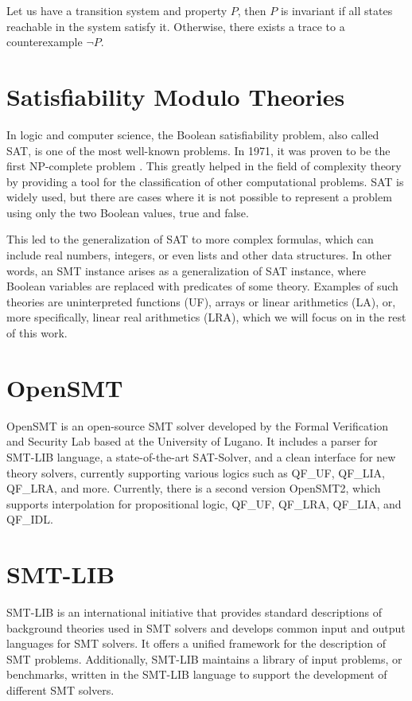 \vspace{\baselineskip}Let us have a transition system and property $P$, then $P$ is invariant if all states reachable in the system satisfy it. Otherwise, there exists a trace to a counterexample $\neg P$.


\section{Satisfiability Modulo Theories}
\noindent In logic and computer science, the Boolean satisfiability problem, also called SAT, is one of the most well-known problems. In 1971, it was proven to be the first NP-complete problem  \cite{10.1145/800157.805047}. This greatly helped in the field of complexity theory by providing a tool for the classification of other computational problems. SAT is widely used, but there are cases where it is not possible to represent a problem using only the two Boolean values, true and false.

This led to the generalization of SAT to more complex formulas, which can include real numbers, integers, or even lists and other data structures. In other words, an SMT instance arises as a generalization of SAT instance, where Boolean variables are replaced with predicates of some theory. Examples of such theories are uninterpreted functions (UF), arrays or linear arithmetics (LA), or, more specifically, linear real arithmetics (LRA), which we will focus on in the rest of this work.
\section{OpenSMT}
\noindent OpenSMT\cite{10.1007/978-3-642-12002-2_12} is an open-source SMT solver developed by the Formal Verification and Security Lab based at the University of Lugano. It includes a parser for SMT-LIB\cite{BarFT-SMTLIB} language, a state-of-the-art SAT-Solver, and a clean interface for new theory solvers, currently supporting various logics such as QF\_UF, QF\_LIA, QF\_LRA, and more. Currently, there is a second version OpenSMT2\cite{10.1007/978-3-319-40970-2_35}, which supports interpolation for propositional logic, QF\_UF, QF\_LRA, QF\_LIA, and QF\_IDL.


\section{SMT-LIB}
\noindent SMT-LIB\cite{BarFT-SMTLIB} is an international initiative that provides standard descriptions of background theories used in SMT solvers and develops common input and output languages for SMT solvers. It offers a unified framework for the description of SMT problems.  Additionally, SMT-LIB maintains a library of input problems, or benchmarks, written in the SMT-LIB language to support the development of different SMT solvers.


